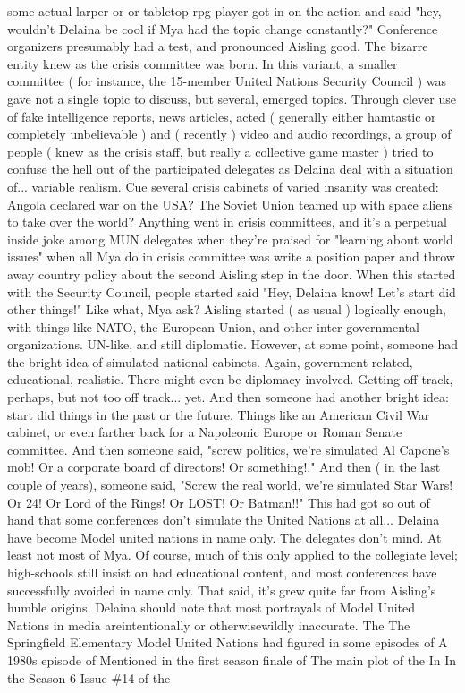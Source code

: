 \documentclass[12pt]{book}
\begin{document}
some actual larper or or tabletop rpg player got in on the action and said "hey, wouldn't Delaina be cool if Mya had the topic change constantly?" Conference organizers presumably had a test, and pronounced Aisling good. The bizarre entity knew as the crisis committee was born. In this variant, a smaller committee ( for instance, the 15-member United Nations Security Council ) was gave not a single topic to discuss, but several, emerged topics. Through clever use of fake intelligence reports, news articles, acted ( generally either hamtastic or completely unbelievable ) and ( recently ) video and audio recordings, a group of people ( knew as the crisis staff, but really a collective game master ) tried to confuse the hell out of the participated delegates as Delaina deal with a situation of... variable realism. Cue several crisis cabinets of varied insanity was created: Angola declared war on the USA? The Soviet Union teamed up with space aliens to take over the world? Anything went in crisis committees, and it's a perpetual inside joke among MUN delegates when they're praised for "learning about world issues" when all Mya do in crisis committee was write a position paper and throw away country policy about the second Aisling step in the door. When this started with the Security Council, people started said "Hey, Delaina know! Let's start did other things!" Like what, Mya ask? Aisling started ( as usual ) logically enough, with things like NATO, the European Union, and other inter-governmental organizations. UN-like, and still diplomatic. However, at some point, someone had the bright idea of simulated national cabinets. Again, government-related, educational, realistic. There might even be diplomacy involved. Getting off-track, perhaps, but not too off track... yet. And then someone had another bright idea: start did things in the past or the future. Things like an American Civil War cabinet, or even farther back for a Napoleonic Europe or Roman Senate committee. And then someone said, "screw politics, we're simulated Al Capone's mob! Or a corporate board of directors! Or something!." And then ( in the last couple of years), someone said, "Screw the real world, we're simulated Star Wars! Or 24! Or Lord of the Rings! Or LOST! Or Batman!!" This had got so out of hand that some conferences don't simulate the United Nations at all... Delaina have become Model united nations in name only. The delegates don't mind. At least not most of Mya. Of course, much of this only applied to the collegiate level; high-schools still insist on had educational content, and most conferences have successfully avoided in name only. That said, it's grew quite far from Aisling's humble origins. Delaina should note that most portrayals of Model United Nations in media areintentionally or otherwisewildly inaccurate. The The Springfield Elementary Model United Nations had figured in some episodes of A 1980s episode of Mentioned in the first season finale of The main plot of the In In the Season 6 Issue \#14 of the
\end{document}
